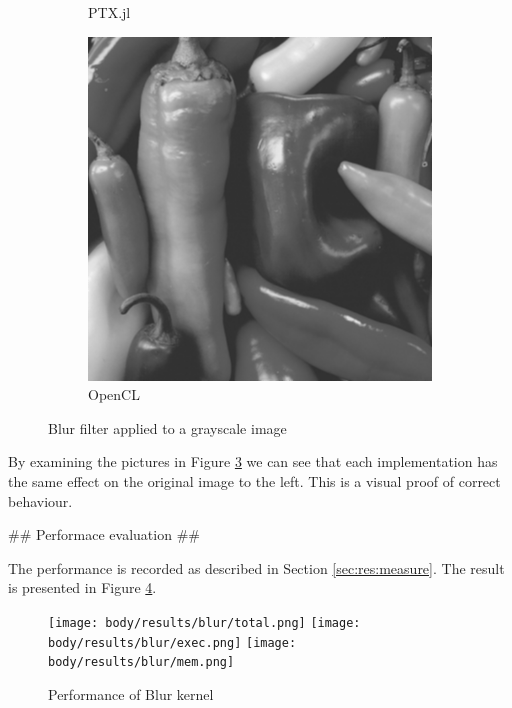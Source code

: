 \begin{markdown}
\begin{figure}[H]
\begin{subfigure}{.49\textwidth}
    \caption{PTX.jl}
    \label{fig:res:blur:pic:julia}
  \end{subfigure}%
  \hspace{.01\textwidth}
  \begin{subfigure}{.49\textwidth}
    \centering
    \includegraphics[width=1\textwidth]{body/figures/results/blur/opencl.png}
    \caption{OpenCL}
    \label{fig:res:blur:pic:opencl}
  \end{subfigure}
  \caption{Blur filter applied to a grayscale image}
  \label{fig:res:blur:pic}
\end{figure}


By examining the pictures in Figure \ref{fig:res:blur:pic} we can see
that each implementation has the same effect on the original image to
the left. This is a visual proof of correct behaviour.

## Performace evaluation ##

The performance is recorded as described in Section
\ref{sec:res:measure}. The result is presented in Figure \ref{fig:res:blur}.

\begin{figure}[H]
  \begin{center}
  \texttt{[image: body/results/blur/total.png]}
  \texttt{[image: body/results/blur/exec.png]}
  \texttt{[image: body/results/blur/mem.png]}
    \caption{Performance of Blur kernel}
    \label{fig:res:blur}
  \end{center}
\end{figure}


\end{markdown}
